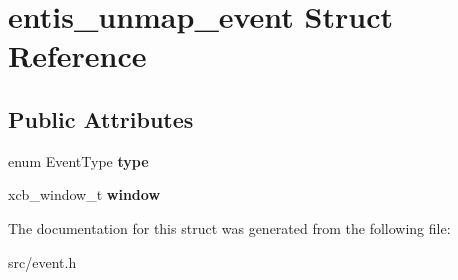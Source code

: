 \hypertarget{structentis__unmap__event}{}\section{entis\+\_\+unmap\+\_\+event Struct Reference}
\label{structentis__unmap__event}
\subsection*{Public Attributes}
\begin{DoxyCompactItemize}
\item 
\mbox{\label{structentis__unmap__event_ad564ac4108064d524226d414aedf52a8}} 
enum Event\+Type {\bfseries type}
\item 
\mbox{\label{structentis__unmap__event_ae19864ad8a3603dc17302e50f1cb14dd}} 
xcb\+\_\+window\+\_\+t {\bfseries window}
\end{DoxyCompactItemize}


The documentation for this struct was generated from the following file\+:\begin{DoxyCompactItemize}
\item 
src/event.\+h\end{DoxyCompactItemize}
